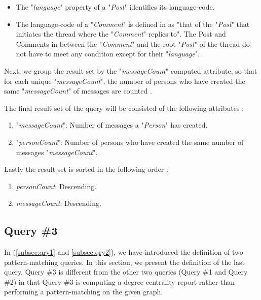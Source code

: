{\begin{itemize}
    \begin{itemize}
    
    \item The "\textit{language}" property of a "\textit{Post}" identifies its language-code. 
    \item The language-code of a "\textit{Comment}" is defined in \cite{prat2017ldbc} as "that of the "\textit{Post}" that initiates the thread where the "\textit{Comment}" replies to". The Post and Comments in between the "\textit{Comment}" and the root "\textit{Post}" of the thread do not have to meet any condition except for their "\textit{language}".
    
    \end{itemize}
    
\end{itemize}

Next, we group the result set by the "\textit{messageCount}" computed attribute, so that for each unique "\textit{messageCount}", the number of persons who have created the same "\textit{messageCount}" of messages are counted \cite{prat2017ldbc}.

The final result set of the query will be consisted of the following attributes \cite{prat2017ldbc}:

\begin{enumerate}
\item "\textit{messageCount}": Number of messages a "\textit{Person}" has created.
\item "\textit{personCount}": Number of persons who have created the same number of messages "\textit{messageCount}".

\end{enumerate}

Lastly the result set is sorted in the following order \cite{prat2017ldbc}:

\begin{enumerate}

\item \textit{personCount}: Descending.
\item \textit{messageCount}: Descending.

\end{enumerate}

\subsection{Query \#3}
\label{subsec:qry3}

In (\ref{subsec:qry1} and \ref{subsec:qry2}), we have introduced the definition of two pattern-matching queries. In this section, we present the definition of the last query. Query \#3 is different from the other two queries (Query \#1 and Query \#2) in that Query \#3 is computing a degree centrality report rather than performing a pattern-matching on the given graph. 

}
